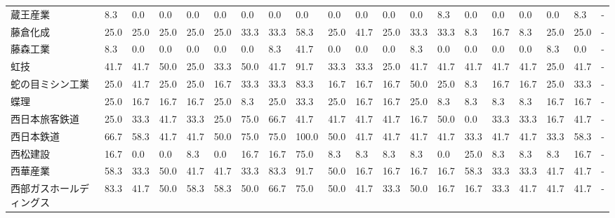 \begin{tabular}{llllllllllllllllllll}
蔵王産業            &    8.3 &    0.0 &       0.0 &       0.0 &        0.0 &    0.0 &    0.0 &    0.0 &     0.0 &     0.0 &    0.0 &   0.0 &    8.3 &     0.0 &     0.0 &   0.0 &   0.0 &   8.3 &     - \\
藤倉化成            &   25.0 &   25.0 &      25.0 &      25.0 &       25.0 &   33.3 &   33.3 &   58.3 &    25.0 &    41.7 &   25.0 &  33.3 &   33.3 &     8.3 &    16.7 &   8.3 &  25.0 &  25.0 &     - \\
藤森工業            &    8.3 &    0.0 &       0.0 &       0.0 &        0.0 &    0.0 &    8.3 &   41.7 &     0.0 &     0.0 &    0.0 &   8.3 &    0.0 &     0.0 &     0.0 &   0.0 &   8.3 &   0.0 &     - \\
虹技              &   41.7 &   41.7 &      50.0 &      25.0 &       33.3 &   50.0 &   41.7 &   91.7 &    33.3 &    33.3 &   25.0 &  41.7 &   41.7 &    41.7 &    41.7 &  41.7 &  25.0 &  41.7 &     - \\
蛇の目ミシン工業        &   25.0 &   41.7 &      25.0 &      25.0 &       16.7 &   33.3 &   33.3 &   83.3 &    16.7 &    16.7 &   16.7 &  50.0 &   25.0 &     8.3 &    16.7 &  16.7 &  25.0 &  33.3 &     - \\
蝶理              &   25.0 &   16.7 &      16.7 &      16.7 &       25.0 &    8.3 &   25.0 &   33.3 &    25.0 &    16.7 &   16.7 &  25.0 &    8.3 &     8.3 &     8.3 &   8.3 &  16.7 &  16.7 &     - \\
西日本旅客鉄道         &   25.0 &   33.3 &      41.7 &      33.3 &       25.0 &   75.0 &   66.7 &   41.7 &    41.7 &    41.7 &   41.7 &  16.7 &   50.0 &     0.0 &    33.3 &  33.3 &  16.7 &  41.7 &     - \\
西日本鉄道           &   66.7 &   58.3 &      41.7 &      41.7 &       50.0 &   75.0 &   75.0 &  100.0 &    50.0 &    41.7 &   41.7 &  41.7 &   41.7 &    33.3 &    41.7 &  41.7 &  33.3 &  58.3 &     - \\
西松建設            &   16.7 &    0.0 &       0.0 &       8.3 &        0.0 &   16.7 &   16.7 &   75.0 &     8.3 &     8.3 &    8.3 &   8.3 &    0.0 &    25.0 &     8.3 &   8.3 &   8.3 &  16.7 &     - \\
西華産業            &   58.3 &   33.3 &      50.0 &      41.7 &       41.7 &   33.3 &   83.3 &   91.7 &    50.0 &    16.7 &   16.7 &  16.7 &   16.7 &    58.3 &    33.3 &  33.3 &  41.7 &  41.7 &     - \\
西部ガスホールディングス    &   83.3 &   41.7 &      50.0 &      58.3 &       58.3 &   50.0 &   66.7 &   75.0 &    50.0 &    41.7 &   33.3 &  50.0 &   16.7 &    16.7 &    33.3 &  41.7 &  41.7 &  41.7 &     - \\

\end{tabular}
